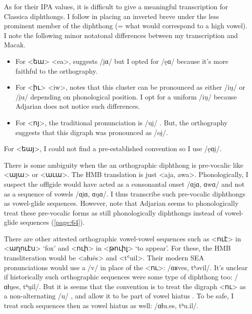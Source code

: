 As for their IPA values, it is difficult to give a meaningful transcription for Classica diphthongs. I follow \citet{Macak-2017-PhonoClassicalArmenian} in placing an inverted breve under the less prominent member of the diphthong (= what would correspond to a high vowel). I note the following minor notatonal differences between my transcription and Macak. 

\begin{itemize}
		\item  For <եա> <ea>, \citet[1041,1043]{Macak-2017-PhonoClassicalArmenian} suggests /i̯ɑ/ but I opted for /e̯ɑ/ because it's more faithful to the orthography. 
		\item  For <իւ> <iw>, \citet[1041,1043]{Macak-2017-PhonoClassicalArmenian}  notes that this cluster can be pronounced as either /iu̯/ or /i̯u/ depending on phonological position. I opt for a uniform /iu̯/ because Adjarian does not notice such differences.
		\item For <ոյ>, the traditional pronunciation is /ui̯/ \citep[1039]{Macak-2017-PhonoClassicalArmenian}. But, the orthography suggests that this digraph was pronounced as /oi̯/. 
\end{itemize}

For <եայ>, I could not find a pre-established convention so I use /e̯ɑi̯/. 
	
There is some ambiguity when the an orthographic diphthong is  pre-vocalic like <այա> or <աւա>. The HMB translation is just <aja, awa>. Phonologically, I suspect the offlgide would have acted as a consonantal onset /ɑjɑ, ɑwɑ/ and not as a sequence of vowels /ɑi̯ɑ, ɑu̯ɑ/. I thus transcribe such pre-vocalic diphthongs as vowel-glide sequences. However, note that Adjarian seems to   phonologically treat these pre-vocalic forms as still phonologically diphthongs instead of vowel-glide sequences  (\ref{page:64}).  




There are other attested orthographic vowel-vowel sequences such as <ուէ> in <աղուէս> `fox' and <ուի> in <թուիլ> `to appear'. For these, the HMB transliteration would be <aɬuēs> and <tʿuil>. Their modern SEA pronunciations would use a /v/ in place of the <ու>: /ɑʁves, tʰəvil/. It's unclear if   historically such orthographic sequences were some type of diphthong too: /ɑɬu̯es, tʰu̯il/. But it is seems that the convention is to treat the digraph <ու> as a non-alternating /u/ \citep[15]{Thomson-1989-IntroClassicalArmenian}, and allow it to be part of vowel hiatus \citep[17]{Thomson-1989-IntroClassicalArmenian}. To be safe, I treat such sequences then as vowel hiatus as well: /ɑɬu.es, tʰu.il/.

